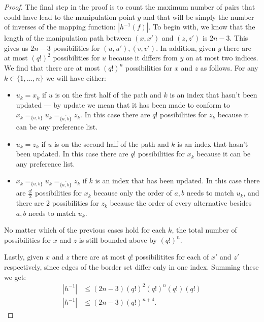 \begin{proof}
		The final step in the proof is to count the maximum number of pairs that could have lead to the manipulation point $y$ and that will be simply the number of inverses of the mapping function: $|h^{-1}(f)|$. To begin with, we know that the length of the manipulation path between $(x, x')$ and $(z, z')$ is $2n - 3$. This gives us $2n - 3$ possibilities for $(u, u'), (v, v')$. In addition, given $y$ there are at most $(q!)^2$ possibilities for $u$ because it differs from $y$ on at most two indices. We find that there are at most $(q!)^n$ possibilities for $x$ and $z$ as follows. For any $k \in \{1, \ldots, n\}$ we will have either:
		\begin{itemize}
			\item $u_k = x_k$ if $u$ is on the first half of the path and $k$ is an index that hasn't been updated --- by update we mean that it has been made to conform to $x_k =_{\{a,b\}} u_k =_{\overline{\{a,b\}}} z_k$. In this case there are $q!$ possibilities for $z_k$ because it can be any preference list.
			\item $u_k = z_k$ if $u$ is on the second half of the path and $k$ is an index that hasn't been updated. In this case there are $q!$ possibilities for $x_k$ because it can be any preference list.
			\item $x_k =_{\{a,b\}} u_k =_{\overline{\{a,b\}}} z_k$ if $k$ is an index that has been updated. In this case there are $\frac{q!}{2}$ possibilities for $x_k$ because only the order of $a, b$ needs to match $u_k$, and there are $2$ possibilities for $z_k$ because the order of every alternative besides $a, b$ needs to match $u_k$.
		\end{itemize}
		No matter which of the previous cases hold for each $k$, the total number of possibilities for $x$ and $z$ is still bounded above by $(q!)^n$.

		Lastly, given $x$ and $z$ there are at most $q!$ possibilitites for each of $x'$ and $z'$ respectively, since edges of the border set differ only in one index. Summing these we get:
		\begin{align*}
			|h^{-1}| &\le (2n - 3)(q!)^2(q!)^n(q!)(q!) \\
			|h^{-1}| &\le (2n - 3)(q!)^{n+4}.
		\end{align*}

	\end{proof}

